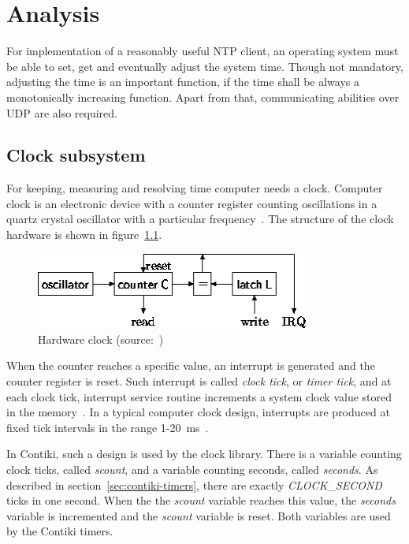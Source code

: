
\chapter{Analysis}
For implementation of a reasonably useful NTP client,
an operating system must be able to set, get and eventually adjust the system time.
Though not mandatory, adjusting the time is an important function,
if the time shall be always a monotonically increasing function.
Apart from that, communicating abilities over UDP are also required.

\section{Clock subsystem}
For keeping, measuring and resolving time computer needs a clock.
Computer clock is an electronic device with a counter register counting oscillations in a
quartz crystal oscillator with a particular frequency~\cite{thesis-sync}.
The structure of the clock hardware is shown in figure~\ref{fig:system-hardware-clock}.
\begin{figure}
  \centering
  \includegraphics[width=9cm,keepaspectratio]{fig/pc-clock.png}
  \caption{Hardware clock (source:~\cite{thesis-beat})}
  \label{fig:system-hardware-clock}
\end{figure}
When the counter reaches a specific value, an interrupt is generated and the counter register is reset.
Such interrupt is called {\it{clock tick}}, or {\it{timer tick}}, and at each clock tick,
interrupt service routine increments a system clock value stored in the memory~\cite{thesis-sync}.
In a typical computer clock design, interrupts are produced at
fixed tick intervals in the range 1-20~ms~\cite{nanokernel}.

In Contiki, such a design is used by the clock library.
There is a variable counting clock ticks, called {\it{scount}},
and a variable counting seconds, called {\it{seconds}}.
As described in section~\ref{sec:contiki-timers}, there are
exactly {\it{CLOCK\_SECOND}} ticks in one second.
When the the {\it{scount}} variable reaches this value,
the {\it{seconds}} variable is incremented and the {\it{scount}} variable is reset.
Both variables are used by the Contiki timers.

